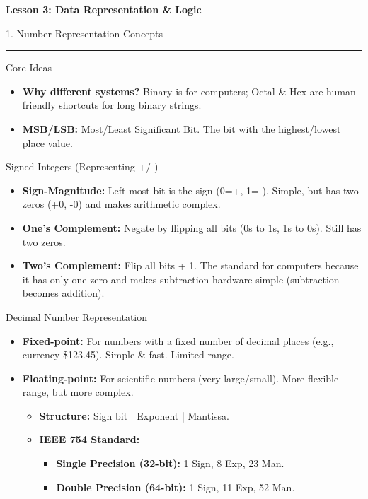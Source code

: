 \documentclass[a4paper, 8pt]{extarticle}
\newcommand{\sectionheading}[1]{%
  \par\vspace{0.7em}
  {\headingfont\fontsize{10.5pt}{11.5pt}\selectfont\color{black}#1}\par\nopagebreak
  \rule{\linewidth}{0.4pt}\vspace{0.2em}\nopagebreak
}
\newcommand{\subsectionheading}[1]{%
  \par\vspace{0.4em}\nopagebreak
  {\headingfont\fontsize{9pt}{10pt}\selectfont\color{black!80}#1}\par\nopagebreak\vspace{-0.3em}
}
\begin{document}
\pagestyle{empty}

\begin{center}
    {\headingfont\fontsize{12pt}{14pt}\selectfont \textbf{Lesson 3: Data Representation \& Logic}}
\end{center}
\vspace{-0.8em}

\begin{multicols}{2}


\sectionheading{1. Number Representation Concepts}
\subsectionheading{Core Ideas}
\begin{itemize}
    \item \textbf{Why different systems?} Binary is for computers; Octal \& Hex are human-friendly shortcuts for long binary strings.
    \item \textbf{MSB/LSB:} Most/Least Significant Bit. The bit with the highest/lowest place value.
\end{itemize}

\subsectionheading{Signed Integers (Representing +/-)}
\begin{itemize}
    \item \textbf{Sign-Magnitude:} Left-most bit is the sign (0=+, 1=-). Simple, but has two zeros (+0, -0) and makes arithmetic complex.
    \item \textbf{One's Complement:} Negate by flipping all bits (0s to 1s, 1s to 0s). Still has two zeros.
    \item \textbf{Two's Complement:} Flip all bits + 1. The standard for computers because it has only one zero and makes subtraction hardware simple (subtraction becomes addition).
\end{itemize}

\subsectionheading{Decimal Number Representation}
\begin{itemize}
    \item \textbf{Fixed-point:} For numbers with a fixed number of decimal places (e.g., currency \$123.45). Simple \& fast. Limited range.
    \item \textbf{Floating-point:} For scientific numbers (very large/small). More flexible range, but more complex.
        \begin{itemize}
            \item \textbf{Structure:} Sign bit | Exponent | Mantissa.
            \item \textbf{IEEE 754 Standard:}
                \begin{itemize}
                    \item \textbf{Single Precision (32-bit):} 1 Sign, 8 Exp, 23 Man.
                    \item \textbf{Double Precision (64-bit):} 1 Sign, 11 Exp, 52 Man.
                \end{itemize}
        \end{itemize}
\end{itemize}


\end{multicols}
\end{document}
